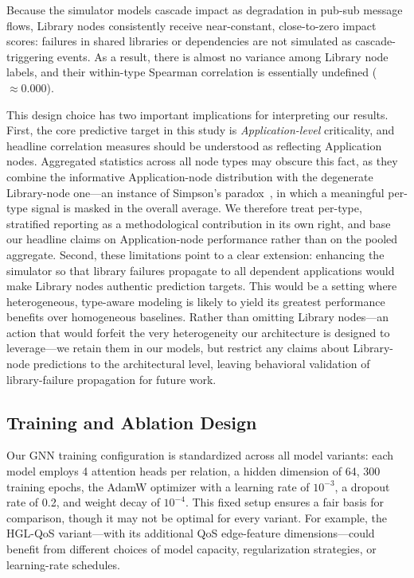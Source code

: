 \documentclass[sigconf,9pt,anonymous]{acmart}
\begin{document}
Because the simulator models cascade impact as degradation in pub-sub message flows, Library nodes consistently receive near-constant, close-to-zero impact scores: failures in shared libraries or dependencies are not simulated as cascade-triggering events. As a result, there is almost no variance among Library node labels, and their within-type Spearman correlation is essentially undefined ($\approx 0.000$).

This design choice has two important implications for interpreting our results. First, the core predictive target in this study is \emph{Application-level} criticality, and headline correlation measures should be understood as reflecting Application nodes. Aggregated statistics across all node types may obscure this fact, as they combine the informative Application-node distribution with the degenerate Library-node one—an instance of Simpson's paradox~\cite{simpson1951interpretation, bickel1975berkeley}, in which a meaningful per-type signal is masked in the overall average. We therefore treat per-type, stratified reporting as a methodological contribution in its own right, and base our headline claims on Application-node performance rather than on the pooled aggregate. Second, these limitations point to a clear extension: enhancing the simulator so that library failures propagate to all dependent applications would make Library nodes authentic prediction targets. This would be a setting where heterogeneous, type-aware modeling is likely to yield its greatest performance benefits over homogeneous baselines. Rather than omitting Library nodes—an action that would forfeit the very heterogeneity our architecture is designed to leverage—we retain them in our models, but restrict any claims about Library-node predictions to the architectural level, leaving behavioral validation of library-failure propagation for future work.

\subsection{Training and Ablation Design}

Our GNN training configuration is standardized across all model variants: each model employs 4 attention heads per relation, a hidden dimension of 64, 300 training epochs, the AdamW optimizer with a learning rate of $10^{-3}$, a dropout rate of 0.2, and weight decay of $10^{-4}$. This fixed setup ensures a fair basis for comparison, though it may not be optimal for every variant. For example, the HGL-QoS variant—with its additional QoS edge-feature dimensions—could benefit from different choices of model capacity, regularization strategies, or learning-rate schedules.
\end{document}
